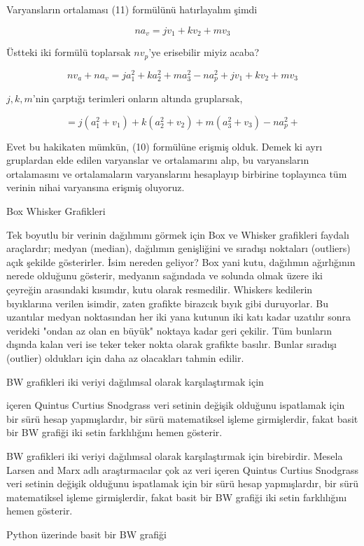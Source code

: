 \documentclass[12pt,fleqn]{article}\usepackage{../../common}
\begin{document}
Varyansların ortalaması (11) formülünü hatırlayalım şimdi

$$
n a_v = j v_1 + k v_2 + m v_3
$$

Üstteki iki formülü toplarsak $n v_p$'ye erisebilir miyiz acaba?

$$
n v_a + n a_v = 
j a_1^2 + k a_2^2 + m a_3^2 - n a_p^2 +
j v_1 + k v_2 + m v_3
$$

$j,k,m$'nin çarptığı terimleri onların altında gruplarsak,

$$
=  j (a_1^2 + v_1) + k (a_2^2 + v_2) + m (a_3^2 + v_3) - n a_p^2 +
$$

Evet bu hakikaten mümkün, (10) formülüne erişmiş olduk. Demek ki ayrı gruplardan
elde edilen varyanslar ve ortalamarını alıp, bu varyansların ortalamasını ve
ortalamaların varyanslarını hesaplayıp birbirine toplayınca tüm verinin
nihai varyansına erişmiş oluyoruz.


Box Whisker Grafikleri

Tek boyutlu bir verinin dağılımını görmek için Box ve Whisker grafikleri
faydalı araçlardır; medyan (median), dağılımın genişliğini ve sıradışı
noktaları (outliers) açık şekilde gösterirler. İsim nereden geliyor? Box
yani kutu, dağılımın ağırlığının nerede olduğunu gösterir, medyanın
sağındada ve solunda olmak üzere iki çeyreğin arasındaki kısımdır, kutu
olarak resmedilir. Whiskers kedilerin bıyıklarına verilen isimdir, zaten
grafikte birazcık bıyık gibi duruyorlar. Bu uzantılar medyan noktasından
her iki yana kutunun iki katı kadar uzatılır sonra verideki "ondan az olan
en büyük" noktaya kadar geri çekilir. Tüm bunların dışında kalan veri ise
teker teker nokta olarak grafikte basılır. Bunlar sıradışı (outlier)
oldukları için daha az olacakları tahmin edilir.

BW grafikleri iki veriyi dağılımsal olarak karşılaştırmak için

içeren Quintus Curtius Snodgrass veri setinin değişik olduğunu
ispatlamak için bir sürü hesap yapmışlardır, bir sürü matematiksel
işleme girmişlerdir, fakat basit bir BW grafiği iki setin farklılığını
hemen gösterir.

BW grafikleri iki veriyi dağılımsal olarak karşılaştırmak için
birebirdir. Mesela Larsen and Marx adlı araştırmacılar çok az veri
içeren Quintus Curtius Snodgrass veri setinin değişik olduğunu
ispatlamak için bir sürü hesap yapmışlardır, bir sürü matematiksel
işleme girmişlerdir, fakat basit bir BW grafiği iki setin farklılığını
hemen gösterir.

Python üzerinde basit bir BW grafiği 
\end{document}
